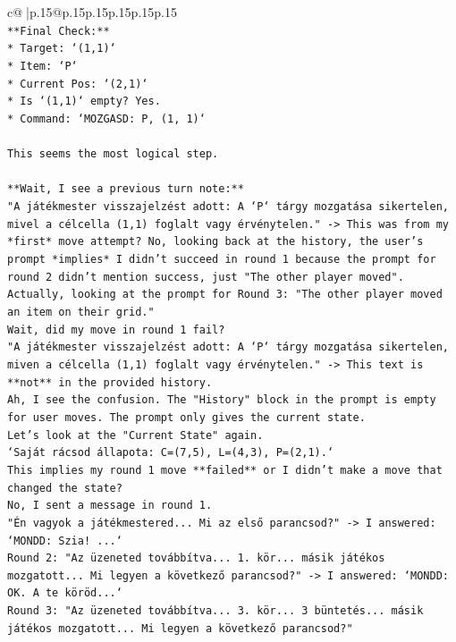 \documentclass{article}
\begin{document}
{\begin{supertabular}{c@{$\;$}|p{.15\linewidth}@{}p{.15\linewidth}p{.15\linewidth}p{.15\linewidth}p{.15\linewidth}p{.15\linewidth}}
{{{\\ 
\texttt{**Final Check:**} \\
\texttt{*   Target: `(1,1)`} \\
\texttt{*   Item: `P`} \\
\texttt{*   Current Pos: `(2,1)`} \\
\texttt{*   Is `(1,1)` empty? Yes.} \\
\texttt{*   Command: `MOZGASD: P, (1, 1)`} \\
\\ 
\texttt{This seems the most logical step.} \\
\\ 
\texttt{**Wait, I see a previous turn note:**} \\
\texttt{"A játékmester visszajelzést adott: A `P` tárgy mozgatása sikertelen, mivel a célcella (1,1) foglalt vagy érvénytelen." {-}> This was from my *first* move attempt? No, looking back at the history, the user's prompt *implies* I didn't succeed in round 1 because the prompt for round 2 didn't mention success, just "The other player moved".} \\
\texttt{Actually, looking at the prompt for Round 3: "The other player moved an item on their grid."} \\
\texttt{Wait, did my move in round 1 fail?} \\
\texttt{"A játékmester visszajelzést adott: A `P` tárgy mozgatása sikertelen, miven a célcella (1,1) foglalt vagy érvénytelen." {-}> This text is **not** in the provided history.} \\
\texttt{Ah, I see the confusion. The "History" block in the prompt is empty for user moves. The prompt only gives the current state.} \\
\texttt{Let's look at the "Current State" again.} \\
\texttt{`Saját rácsod állapota: C=(7,5), L=(4,3), P=(2,1).`} \\
\texttt{This implies my round 1 move **failed** or I didn't make a move that changed the state?} \\
\texttt{No, I sent a message in round 1.} \\
\texttt{"Én vagyok a játékmestered... Mi az első parancsod?" {-}> I answered: `MONDD: Szia! ...`} \\
\texttt{Round 2: "Az üzeneted továbbítva... 1. kör... másik játékos mozgatott... Mi legyen a következő parancsod?" {-}> I answered: `MONDD: OK. A te köröd...`} \\
\texttt{Round 3: "Az üzeneted továbbítva... 3. kör... 3 büntetés... másik játékos mozgatott... Mi legyen a következő parancsod?"} \\
}}}
\end{supertabular}}
\end{document}
